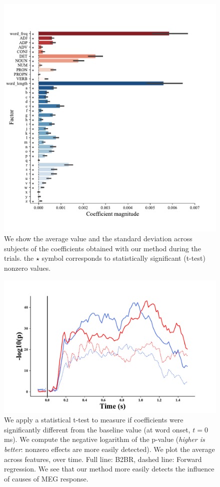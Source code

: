 \documentclass{article}
\begin{document}
\begin{figure}[h]
  \centering
  \includegraphics[width=\textwidth, trim=0cm 0cm 0cm 0cm]{figures/pvalues_vertical.pdf}
  \caption{We show the average value and the standard deviation across subjects of the coefficients obtained with our method during the trials. the $\star$  symbol corresponds to statistically significant (t-test) nonzero values.}
  \label{fig:ridgebaselineresult}
\end{figure}


\begin{figure}[h]
  \centering
  \includegraphics[width=\textwidth, trim=0cm 0cm 0cm 0cm]{figures/pvalues.pdf}
  \caption{We apply a statistical t-test to measure if coefficients were significantly different from the baseline value (at word onset, $t=0$ms).
  We compute the negative logarithm of the p-value (\textit{higher is better}: nonzero effects are more easily detected). We plot the average across features, over time.
  Full line: B2BR, dashed line: Forward regression. We see that our method more easily detects the influence of causes of MEG response.}
\end{figure}
\end{document}
